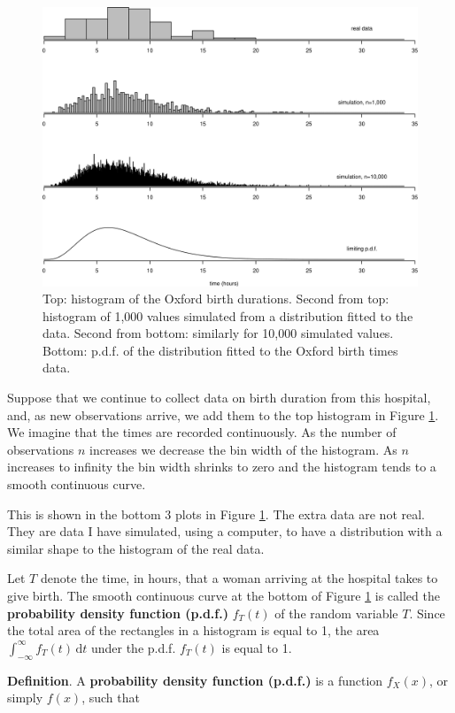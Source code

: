 \documentclass[
  11pt,
  british,
  openany, a4paper]{book}
\begin{document}
\begin{figure}

{\centering \includegraphics[width=0.75\linewidth]{images/ox_cont_var} 

}

\caption{Top: histogram of the Oxford birth durations. Second from top: histogram of 1,000 values simulated from a distribution fitted to the data. Second from bottom: similarly for 10,000 simulated values. Bottom: p.d.f. of the distribution fitted to the Oxford birth times data.}\label{fig:oxcontvar}
\end{figure}

Suppose that we continue to collect data on birth duration from this hospital, and, as new observations arrive, we add them to the top histogram in Figure \ref{fig:oxcontvar}. We imagine that the times are recorded continuously. As the number of observations \(n\) increases we decrease the bin width of the histogram. As \(n\) increases to infinity the bin width shrinks to zero and the histogram tends to a smooth continuous curve.

This is shown in the bottom 3 plots in Figure \ref{fig:oxcontvar}. The extra data are not real. They are data I have simulated, using a computer, to have a distribution with a similar shape to the histogram of the real data.

Let \(T\) denote the time, in hours, that a woman arriving at the hospital takes to give birth. The smooth continuous curve at the bottom of Figure \ref{fig:oxcontvar} is called the \textbf{probability density function (p.d.f.)} \(f_T(t)\) of the random variable \(T\). Since the total area of the rectangles in a histogram is equal to 1, the area \(\int_{-\infty}^{\infty} f_T(t) \, \mathrm{d}t\) under the p.d.f. \(f_T(t)\) is equal to 1.

\textbf{Definition}. A \textbf{probability density function (p.d.f.)} is a function \(f_{X}(x)\), or simply \(f(x)\), such that
\end{document}
